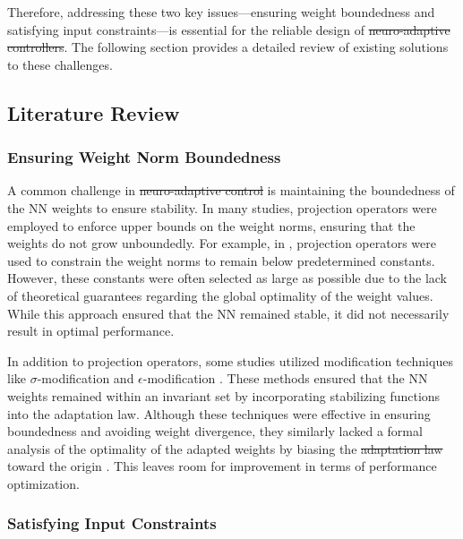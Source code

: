\documentclass[letterpaper, journal]{IEEEtran}
\providecommand{\DIFadd}[1]{{\protect\color{blue}\uwave{#1}}} %
\providecommand{\DIFdel}[1]{{\protect\color{red}\sout{#1}}} %
\providecommand{\DIFaddbegin}{} %
\providecommand{\DIFaddend}{} %
\providecommand{\DIFdelbegin}{} %
\providecommand{\DIFdelend}{} %
\begin{document}
Therefore, addressing these two key issues—ensuring weight boundedness and satisfying input constraints—is essential for the reliable design of \DIFdelbegin \DIFdel{neuro-adaptive controllers}\DIFdelend \DIFaddbegin \DIFadd{NAC}\DIFaddend . 
The following section provides a detailed review of existing solutions to these challenges.

\subsection{Literature Review}

\subsubsection{Ensuring Weight Norm Boundedness}

A common challenge in \DIFdelbegin \DIFdel{neuro-adaptive control }\DIFdelend \DIFaddbegin \DIFadd{NAC }\DIFaddend is maintaining the boundedness of the NN weights to ensure stability. 
In many studies, projection operators were employed to enforce upper bounds on the weight norms, ensuring that the weights do not grow unboundedly. 
For example, in \cite{Zhou:2023aa,Griffis:2023aa,Patil:2022aa}, projection operators were used to constrain the weight norms to remain below predetermined constants. 
However, these constants were often selected as large as possible due to the lack of theoretical guarantees regarding the global optimality of the weight values. 
While this approach ensured that the NN remained stable, it did not necessarily result in optimal performance.

In addition to projection operators, some studies utilized modification techniques like $\sigma$-modification \cite{Ge:2002aa} and $\epsilon$-modification \cite{Esfandiari:2015aa,Gao:2006aa}. 
These methods ensured that the NN weights remained within an invariant set by incorporating stabilizing functions into the adaptation law. 
Although these techniques were effective in ensuring boundedness and avoiding weight divergence, they similarly lacked a formal analysis of the optimality of the adapted weights by biasing the \DIFdelbegin \DIFdel{adaptation law }\DIFdelend \DIFaddbegin \DIFadd{weights }\DIFaddend toward the origin \cite{Ryu:2024aa}.
This leaves room for improvement in terms of performance optimization.

\hfill

\subsubsection{Satisfying Input Constraints}
\end{document}
